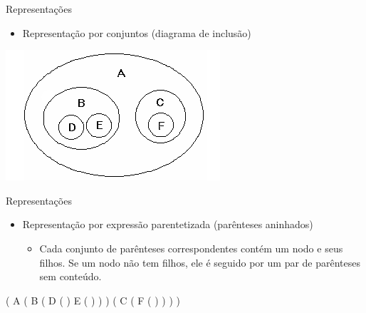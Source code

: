 \documentclass[12pt,table,xcolor={dvipsnames}]{beamer}
\begin{document}
\begin{frame}[fragile]{Representações}
          \begin{itemize}
		  \item Representação por conjuntos (diagrama de inclusão)
          \end{itemize}
          \begin{center}
          \includegraphics[scale=.95]{sets.png} 
          \end{center}
\end{frame} 

\begin{frame}[fragile]{Representações}
\begin{itemize}
\item Representação por expressão parentetizada (parênteses aninhados)
\begin{itemize}
\item  Cada conjunto de parênteses correspondentes contém um nodo e seus filhos. Se um nodo não tem filhos, ele é seguido por um par de parênteses sem conteúdo.
\end{itemize}
\end{itemize}
\begin{center}
 ( A ( \color{red} B ( \color{blue} D ( ) E ( ) \color{red}) \color{black} ) ( \color{red} C ( \color{blue}F ( ) \color{red} ) \color{black} ) )
\end{center}
\end{frame}
\end{document}
